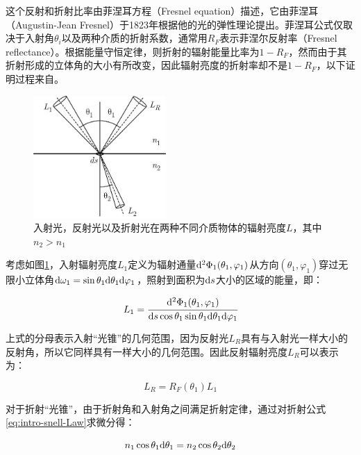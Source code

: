 这个反射和折射比率由菲涅耳方程（Fresnel equation）描述，它由菲涅耳（Augustin-Jean Fresnel）于1823年根据他的光的弹性理论提出。菲涅耳公式仅取决于入射角$\theta_i$以及两种介质的折射系数，通常用$R_F$表示菲涅尔反射率（Fresnel reflectance）。根据能量守恒定律，则折射的辐射能量比率为$1-R_F$，然而由于其折射形成的立体角的大小有所改变，因此辐射亮度的折射率却不是$1-R_F$，以下证明过程来自\cite{a:ReflectionandtransmissionoflightbyaflatinterfaceFresnelsformulae}。

\begin{figure}
	\sidecaption
	\includegraphics[width=0.45\textwidth]{figures/intro/fresnel}
	\caption{入射光，反射光以及折射光在两种不同介质物体的辐射亮度$L$，其中$n_2>n_1$}
	\label{f:intro-fresnel}
\end{figure}

考虑如图\ref{f:intro-fresnel}，入射辐射亮度$L_1$定义为辐射通量${\rm d}^{2}\Phi_1(\theta_1,\varphi_1)$从方向$(\theta_1,\varphi_1)$穿过无限小立体角${\rm d}\omega_1=\sin\theta_1 {\rm d}\theta_1 {\rm d}\varphi_1$，照射到面积为${\rm d}s$大小的区域的能量，即：

\begin{equation}
	L_1= \cfrac{{\rm d}^{2}\Phi_1(\theta_1,\varphi_1)}{{\rm d}s\cos\theta_1 \sin\theta_1 {\rm d}\theta_1 {\rm d}\varphi_1}
\end{equation}

\noindent 上式的分母表示入射“光锥”的几何范围，因为反射光$L_R$具有与入射光一样大小的反射角，所以它同样具有一样大小的几何范围。因此反射辐射亮度$L_R$可以表示为：

 \begin{equation}
 	L_R=R_F(\theta_1)L_1
 \end{equation}

\noindent 对于折射“光锥”，由于折射角和入射角之间满足折射定律，通过对折射公式\ref{eq:intro-snell-Law}求微分得：

\begin{equation}\label{eq:intro-snell-Law-diff}
	n_1 \cos\theta_1 {\rm d}\theta_1=n_2 \cos\theta_2 {\rm d}\theta_2
\end{equation}

